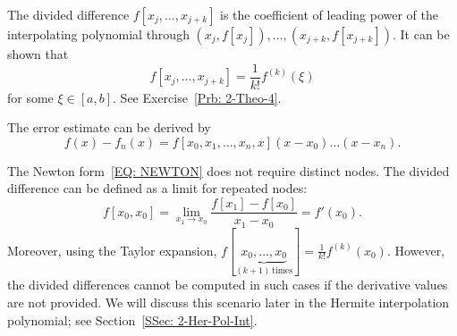\begin{remark}
    The divided difference $f[x_j, \dots, x_{j+k}]$ is the coefficient of leading power of the interpolating polynomial through $(x_j, f[x_j]), \dots, (x_{j+k}, f[x_{j+k}])$. It can be shown that 
    $$f[x_j, \dots, x_{j+k}] = \frac{1}{k!}f^{(k)}(\xi)$$
    for some $\xi\in [a, b]$. See Exercise~\ref{Prb: 2-Theo-4}.
\end{remark}
\begin{remark}
\label{Rem: 2-New-err}
    The error estimate can be derived by
    \begin{equation}
        f(x) - f_n(x) = f[x_0, x_1, \dots, x_n, x] (x-x_0)\dots (x - x_n).
    \end{equation}
\end{remark}
\begin{remark}
    The Newton form~\eqref{EQ: NEWTON} does not require distinct nodes. The divided difference can be defined as a limit for repeated nodes:
    \begin{equation}
        f[x_0, x_0] = \lim_{x_1 \to x_0} \frac{f[x_1] - f[x_0]}{x_1 - x_0} = f'(x_0).
    \end{equation}
    Moreover, using the Taylor expansion, $f[\underbrace{x_0,\dots, x_0}_{(k+1)\,\text{times}}] = \frac{1}{k!}f^{(k)}(x_0)$. However, the divided differences cannot be computed in such cases if the derivative values are not provided. We will discuss this scenario later in the Hermite interpolation polynomial; see Section~\ref{SSec: 2-Her-Pol-Int}.
\end{remark}
